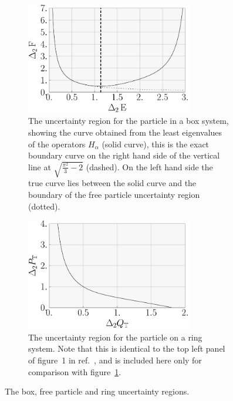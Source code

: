\begin{figure}[ht]
  \centering
  \begin{subfigure}{\textwidth}
    \centering
    \includegraphics[width=0.8\textwidth]{box-ur2}  
  \caption{The uncertainty region for the particle in a box system, showing the curve obtained from the least eigenvalues of the operators $H_\alpha$ (solid curve), this is the exact boundary curve on the right hand side of the vertical line at $\sqrt{\frac{\pi^2}{3} -2}$ (dashed). On the left hand side the true curve lies between the solid curve and the boundary of the free particle uncertainty region (dotted).}
  \label{fig:box-ur}
  \end{subfigure}
  \begin{subfigure}{\textwidth}
    \centering
    \includegraphics[width=0.8\textwidth]{ring-ur2}  
    \caption{The uncertainty region for the particle on a ring system. Note that this is identical to the top left panel of figure~1 in ref.~\cite{sharp-ur-num-angle}, and is included here only for comparison with figure~\ref{fig:box-ur}.}
    \label{fig:ring-ur}
  \end{subfigure}
  \caption{The box, free particle and ring uncertainty regions.}
\end{figure}
